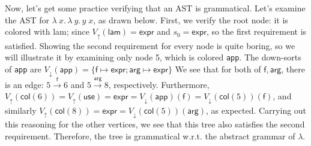 \documentclass[11pt]{article} %
\theoremstyle{definition}
\newcommand{\fn}{\lambda\:\!}
\begin{document}


Now, let's get some practice verifying that an AST is grammatical.
Let's examine the AST for $\fn x.\,\fn y.\,y\;x$, as drawn below.
First, we verify the root node: it is colored with \textsf{lam}; since $V_\uparrow(\mathsf{lam}) = \mathsf{expr}$ and $s_0 = \mathsf{expr}$, so the first requirement is satisfied.
Showing the second requirement for every node is quite boring, so we will illustrate it by examining only node 5, which is colored \texttt{app}.
The down-sorts of \texttt{app} are $V_\downarrow(\mathsf{app}) = \{\mathsf{f} \mapsto \mathsf{expr}; \mathsf{arg} \mapsto \mathsf{expr}\}$
We see that for both of $\mathsf{f}, \mathsf{arg}$, there is an edge: $5 \overset{\mathsf{f}}\to 6$ and $5 \overset{\mathsf{arg}}\to 8$, respectively.
Furthermore, $V_\uparrow(\mathsf{col}(6)) = V_\uparrow(\mathsf{use}) = \mathsf{expr} = V_\downarrow(\mathsf{app})(\mathsf{f}) = V_\downarrow(\mathsf{col}(5))(\mathsf{f})$, and similarly $V_\uparrow(\mathsf{col}(8)) = \mathsf{expr} = V_\downarrow(\mathsf{col}(5))(\mathsf{arg})$, as expected.
Carrying out this reasoning for the other vertices, we see that this tree also satisfies the second requirement.
Therefore, the tree is grammatical w.r.t. the abstract grammar of $\lambda$.
\end{document}
